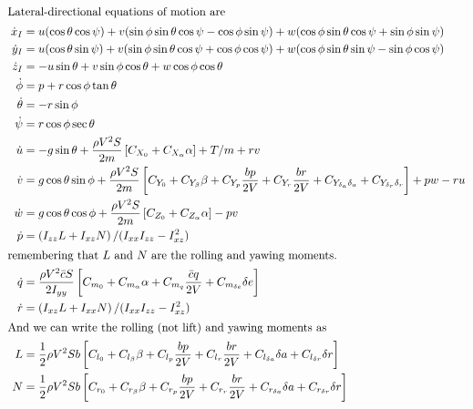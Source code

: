 \documentclass{article}
\begin{document}
\begin{align}
  \intertext{Lateral-directional equations of motion are}\; \dot{x}_I &=
  u (\cos \theta \cos \psi) + v (\sin \phi \sin \theta \cos \psi - \cos \phi \sin \psi) +  w (\cos \phi \sin \theta \cos \psi + \sin \phi \sin \psi) \\
  \dot{y}_I &= u (\cos \theta \sin \psi) + v (\sin \phi \sin \theta \cos \psi +
  \cos \phi \cos \psi) +
  w (\cos \phi \sin \theta \sin \psi - \sin \phi \cos \psi) \\
  \dot{z}_I &= - u \sin \theta + v \sin \phi \cos \theta + w \cos \phi \cos \theta \\
  \dot{\phi} &= p + r \cos \phi \tan \theta \\
  \dot{\theta} &= - r \sin \phi \\
  \dot{\psi} &= r \cos \phi \sec \theta \\
  \dot{u} &= -g \sin \theta + \frac{\rho V^2 S}{2m}\left [ C_{X_0} + C_{X_\alpha}\alpha
    \right ] + T/m +rv \\
  \dot{v} &= g \cos \theta \sin \phi + \frac{\rho V^2 S}{2m}\left [ C_{Y_0} + C_{Y_\beta}\beta
    + C_{Y_p}\frac{bp}{2V} + C_{Y_r}\frac{br}{2V} + C_{Y_{\delta_a}\delta_a} + C_{Y_{\delta_r}\delta_r} \right ] +pw - ru \\
  \dot{w} &= g \cos \theta \cos \phi + \frac{\rho V^2 S}{2m}\left [ C_{Z_0} + C_{Z_\alpha}\alpha
    \right ] -pv \\
  \dot{p} &= \left (I_{zz}L + I_{xz}N \right ) / (I_{xx} I_{zz} - I^2_{xz}) \\
  \intertext{remembering that $L$ and $N$ are the rolling and yawing moments.}
  \dot{q} &= \frac{\rho V^2\bar{c}S}{2I_{yy}} \left [C_{m_0} + C_{m_\alpha}\alpha + C_{m_q} \frac{\bar{c}q}{2V} + C_{m_{\delta e}} \delta e \right ]   \\
  \dot{r} &= \left (I_{xz}L + I_{xx}N \right ) / (I_{xx} I_{zz} - I^2_{xz}) \\
  \intertext{And we can write the rolling (not lift) and yawing moments as}
  L&=\frac{1}{2}\rho V^2 S b \left [ C_{l_0} + C_{l_\beta}\beta + C_{l_p}\frac{bp}{2V} + C_{l_r}\frac{br}{2V} + C_{l_{\delta a}} \delta a + C_{l_{\delta r}} \delta r \right ] \\
  N&=\frac{1}{2}\rho V^2 S b \left [ C_{r_0} + C_{r_\beta}\beta + C_{r_p}\frac{bp}{2V} + C_{r_r}\frac{br}{2V} + C_{r_{\delta a}} \delta a + C_{r_{\delta r}} \delta r \right ] \\
\end{align}
\end{document}
